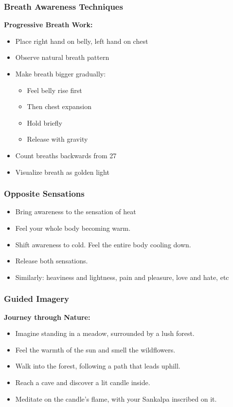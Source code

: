 \begin{frame}[fragile]\frametitle{Breath Awareness Techniques}
    \textbf{Progressive Breath Work:}
    \begin{itemize}
        \item Place right hand on belly, left hand on chest
        \item Observe natural breath pattern
        \item Make breath bigger gradually:
        \begin{itemize}
            \item Feel belly rise first
            \item Then chest expansion
            \item Hold briefly
            \item Release with gravity
        \end{itemize}
        \item Count breaths backwards from 27
        \item Visualize breath as golden light
    \end{itemize}
\end{frame}

\begin{frame}[fragile]\frametitle{Opposite Sensations}
    \begin{itemize}
        \item Bring awareness to the sensation of heat
        \item Feel your whole body becoming warm.
        \item Shift awareness to cold. Feel the entire body cooling down.
        \item Release both sensations.
		\item Similarly: heaviness and lightness, pain and pleasure, love and hate, etc
    \end{itemize}
\end{frame}

\begin{frame}[fragile]\frametitle{Guided Imagery}
    \textbf{Journey through Nature:}
    \begin{itemize}
        \item Imagine standing in a meadow, surrounded by a lush forest.
        \item Feel the warmth of the sun and smell the wildflowers.
        \item Walk into the forest, following a path that leads uphill.
        \item Reach a cave and discover a lit candle inside.
        \item Meditate on the candle's flame, with your Sankalpa inscribed on it.
    \end{itemize}
\end{frame}

